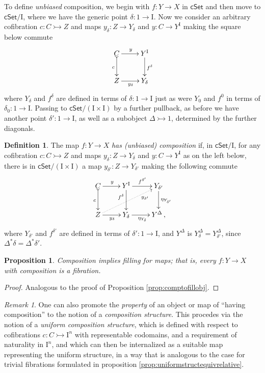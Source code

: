 \documentclass[12pt]{article}
\newcommand{\cSet}{\ensuremath{\mathsf{cSet}}}
\newcommand{\mono}{\ensuremath{\rightarrowtail}}
\newcommand{\ra}{\ensuremath{\rightarrow}}
\newcommand{\I}{\ensuremath{\mathrm{I}}}
\newtheorem{proposition}[theorem]{Proposition}
\theoremstyle{remark}
\newtheorem{remark}[theorem]{Remark}
\theoremstyle{definition}
\newtheorem{definition}[theorem]{Definition}
\begin{document}
To define \emph{unbiased} composition, we begin with $f : Y\ra X$ in $\cSet$ and then move to $\cSet/\I$, where we have the generic point $\delta : 1\ra\I$.  Now we consider an arbitrary cofibration $c : C\mono Z$ and maps $y_\delta : Z\ra Y_\delta$ and $y : C\ra Y^\I$ making the square below commute
\begin{equation}\label{diagram:composition3}
\xymatrix{
C \ar@{>->}[d]_{c} \ar[r]^{y} & Y^\I \ar[d]^{f^\delta} \\
Z \ar[r]_{y_\delta} & Y_\delta 
}
\end{equation}
where $Y_\delta$ and $f^\delta$ are defined in terms of $\delta : 1\ra \I$ just as were $Y_0$ and $f^0$ in terms of $\delta_0 : 1\ra \I$.  Passing to $\cSet/(\I\times \I)$ by a further pullback, as before we have another point $\delta':1\ra\I$, as well as a subobject $\Delta \mono 1$, determined by the further diagonals.

\begin{definition}
The map $f:Y\ra X$ \emph{has (unbiased) composition} if, in $\cSet/\I$, for any cofibration $c : C\mono Z$ and maps $y_\delta : Z\ra Y_\delta$ and $y : C\ra Y^\I$ as on the left below, there is in $\cSet/(\I\times \I)$ a map $y_{\delta'} : Z\ra Y_{\delta'}$ making the following commute
\begin{equation}\label{diagram:composition4}
\xymatrix{
C \ar@{>->}[d]_{c} \ar[r]^{y} & Y^\I \ar[d]_>>>>>>>{f^\delta} \ar[r]^{f^{\delta'}} & Y_{\delta'} \ar[d]^{\eta_{Y_{\delta'}}}\\
Z \ar@{..>}[rru]_>>>>>>{y_{\delta'}} \ar[r]_{y_\delta} & Y_\delta \ar[r]_{\eta_{Y_\delta}} & Y^\Delta\,,
}
\end{equation}
where $Y_{\delta'}$ and $f^{\delta'}$ are defined in terms of $\delta' : 1\ra \I$, and $Y^\Delta$ is $Y_\delta^\Delta = Y_{\delta'}^\Delta$, since $\Delta^*{\delta} = \Delta^*{\delta'}$.
\end{definition}


\begin{proposition}\label{prop:comptofillmap}
Composition implies filling for maps; that is, every $f : Y\ra X$ with composition is a fibration.
\end{proposition}

\begin{proof}
Analogous to the proof of Proposition \ref{prop:comptofillobj}.
\end{proof}

\begin{remark}
One can also promote the \emph{property} of an object or map of ``having composition'' to the notion of a \emph{composition structure}.  This procedes via the notion of a \emph{uniform composition structure}, which is defined with respect to cofibrations $c : C\mono \I^n$ with representable codomains, and a requirement of naturality in $\I^n$, and which can then be internalized as a suitable map representing the uniform structure, in a way that is analogous to the case for trivial fibrations formulated in proposition \ref{prop:uniformstructequivrelative}.
\end{remark}
\end{document}
